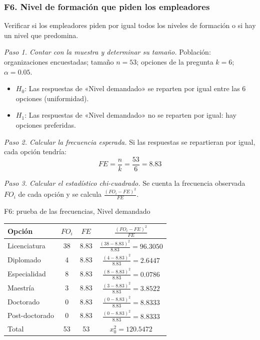 \subsubsection*{F6. Nivel de formación que piden los empleadores}

Verificar si los empleadores piden por igual todos los niveles de formación o si hay un nivel que predomina.

\textit{Paso 1. Contar con la muestra y determinar su tamaño.} Población: organizaciones encuestadas; tamaño $n = 53$; opciones de la pregunta $k = 6$; $\alpha = 0.05$.

\begin{itemize}[nosep]
  \item $H_0$: Las respuestas de «Nivel demandado» se reparten por igual entre las 6 opciones (uniformidad).
  \item $H_1$: Las respuestas de «Nivel demandado» no se reparten por igual: hay opciones preferidas.
\end{itemize}

\textit{Paso 2. Calcular la frecuencia esperada.} Si las respuestas se repartieran por igual, cada opción tendría:
\[
FE = \frac{n}{k} = \frac{53}{6} = 8.83
\]

\textit{Paso 3. Calcular el estadístico chi-cuadrado.} Se cuenta la frecuencia observada $FO_i$ de cada opción y se calcula $\frac{(FO_i - FE)^2}{FE}$.

\begin{mitabla}{F6: prueba de las frecuencias, Nivel demandado}
\begin{tabular}{L{6cm}ccc}
\toprule
Opción & $FO_i$ & $FE$ & $\frac{(FO_i-FE)^2}{FE}$ \\
\midrule
Licenciatura & 38 & 8.83 & $\frac{(38-8.83)^2}{8.83} = 96.3050$ \\[3pt]
Diplomado & 4 & 8.83 & $\frac{(4-8.83)^2}{8.83} = 2.6447$ \\[3pt]
Especialidad & 8 & 8.83 & $\frac{(8-8.83)^2}{8.83} = 0.0786$ \\[3pt]
Maestría & 3 & 8.83 & $\frac{(3-8.83)^2}{8.83} = 3.8522$ \\[3pt]
Doctorado & 0 & 8.83 & $\frac{(0-8.83)^2}{8.83} = 8.8333$ \\[3pt]
Post-doctorado & 0 & 8.83 & $\frac{(0-8.83)^2}{8.83} = 8.8333$ \\[3pt]
\midrule
Total & 53 & 53 & $x_0^2 = 120.5472$ \\
\bottomrule
\end{tabular}
\end{mitabla}

